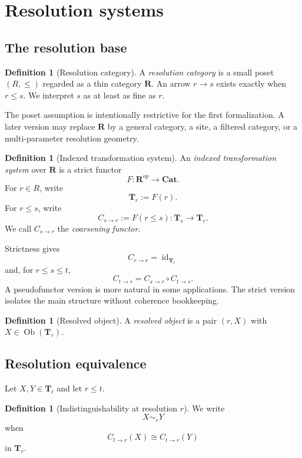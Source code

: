 \documentclass[11pt]{article}
\theoremstyle{definition}
\newtheorem{definition}[theorem]{Definition}
\theoremstyle{remark}
\newcommand{\Rcat}{\mathbf R}
\newcommand{\Tcat}{\mathbf T}
\newcommand{\Cat}{\mathbf{Cat}}
\newcommand{\Ob}{\operatorname{Ob}}
\newcommand{\id}{\operatorname{id}}
\begin{document}
\section{Resolution systems}

\subsection{The resolution base}

\begin{definition}[Resolution category]
A \emph{resolution category} is a small poset $(R,\le)$ regarded as a thin category $\Rcat$. An arrow $r\to s$ exists exactly when $r\le s$. We interpret $s$ as at least as fine as $r$.
\end{definition}

The poset assumption is intentionally restrictive for the first formalization. A later version may replace $\Rcat$ by a general category, a site, a filtered category, or a multi-parameter resolution geometry.

\begin{definition}[Indexed transformation system]
An \emph{indexed transformation system} over $\Rcat$ is a strict functor
\[
F:\Rcat^{op}\longrightarrow\Cat.
\]
For $r\in R$, write
\[
\Tcat_r:=F(r).
\]
For $r\le s$, write
\[
C_{s\to r}:=F(r\le s):\Tcat_s\longrightarrow\Tcat_r.
\]
We call $C_{s\to r}$ the \emph{coarsening functor}.
\end{definition}

Strictness gives
\[
C_{r\to r}=\id_{\Tcat_r}
\]
and, for $r\le s\le t$,
\[
C_{t\to r}=C_{s\to r}\circ C_{t\to s}.
\]
A pseudofunctor version is more natural in some applications. The strict version isolates the main structure without coherence bookkeeping.

\begin{definition}[Resolved object]
A \emph{resolved object} is a pair $(r,X)$ with $X\in\Ob(\Tcat_r)$.
\end{definition}

\subsection{Resolution equivalence}

Let $X,Y\in\Tcat_t$ and let $r\le t$.

\begin{definition}[Indistinguishability at resolution $r$]
We write
\[
X\sim_r Y
\]
when
\[
C_{t\to r}(X)\cong C_{t\to r}(Y)
\]
in $\Tcat_r$.
\end{definition}
\end{document}
